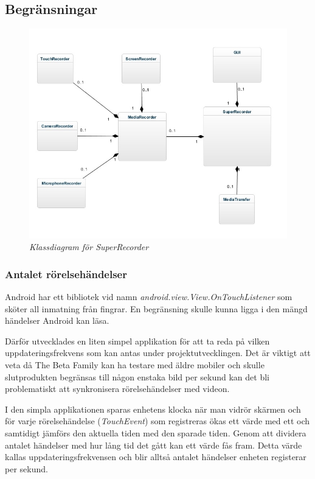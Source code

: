 \subsection{Begränsningar}
\label{subsec:constraints}

\begin{figure}[H]
\centering
\includegraphics[width=\textwidth,height=\textheight,keepaspectratio]{SuperRecorderClassDiagram-diag.jpg}
\caption*{\textit{Klassdiagram för SuperRecorder}}
\label{figure:class}
\end{figure}

\subsubsection{Antalet rörelsehändelser}
\label{touchevents}
Android har ett bibliotek vid namn \emph{android.view.View.OnTouchListener}\parencite{touchlistener} som sköter all inmatning från fingrar. En begränsning skulle kunna ligga i den mängd händelser Android kan läsa. 

Därför utvecklades en liten simpel applikation för att ta reda på vilken uppdateringsfrekvens som kan antas under projektutvecklingen. Det är viktigt att veta då The Beta Family kan ha testare med äldre mobiler och skulle slutprodukten begränsas till någon enstaka bild per sekund kan det bli problematiskt att synkronisera rörelsehändelser med videon.

I den simpla applikationen sparas enhetens klocka när man vidrör skärmen och för varje rörelsehändelse (\emph{TouchEvent}) som registreras ökas ett värde med ett och samtidigt jämförs den aktuella tiden med den sparade tiden. Genom att dividera antalet händelser med hur lång tid det gått kan ett värde fås fram. Detta värde kallas uppdateringsfrekvensen och blir alltså antalet händelser enheten registerar per sekund.

